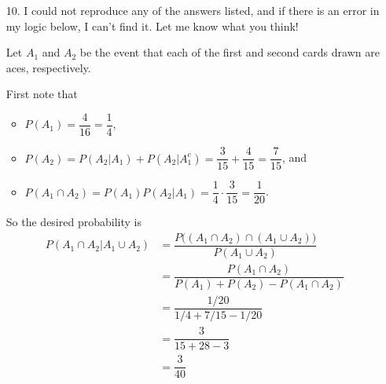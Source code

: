 \documentclass[11pt,fleqn,dvipsnames,usenames]{article}
\begin{document}
\begin{enumerate}
\item[10.] \note I could not reproduce any of the answers listed, and if there is an error in my logic below, I can't find it.  Let me know what you think!

Let $A_{1}$ and $A_{2}$ be the event that each of the first and second cards drawn are aces, respectively.

First note that
\begin{itemize}
\item $P(A_{1}) = \dfrac{4}{16} = \dfrac{1}{4}$,
\item $P(A_{2}) = P(A_{2}|A_{1}) + P(A_{2}|A_{1}^{c}) = \dfrac{3}{15} + \dfrac{4}{15} = \dfrac{7}{15}$, and
\item $P(A_{1}\cap A_{2}) = P(A_{1})P(A_{2}|A_{1}) = \dfrac{1}{4}\cdot \dfrac{3}{15} = \dfrac{1}{20}$.
\end{itemize}
So the desired probability is
\begin{align*}
P(A_{1}\cap A_{2}|A_{1}\cup A_{2}) &= \dfrac{P\big((A_{1}\cap A_{2})\cap (A_{1}\cup A_{2})\big)}{P(A_{1}\cup A_{2})}\\
&= \dfrac{P(A_{1}\cap A_{2})}{P(A_{1}) + P(A_{2}) - P(A_{1}\cap A_{2})}\\
&= \dfrac{1/20}{1/4 + 7/15 - 1/20}\\
&= \dfrac{3}{15 + 28 - 3}\\
&= \dfrac{3}{40}
\end{align*}
\end{enumerate}
\end{document}
